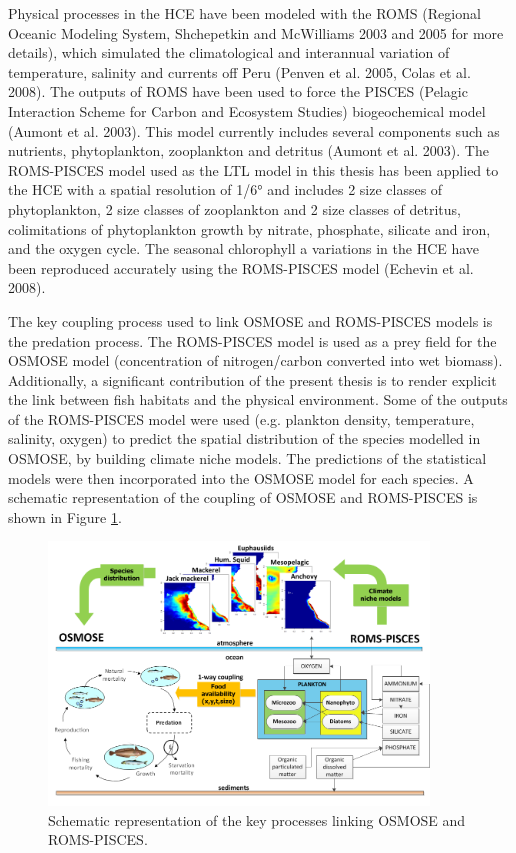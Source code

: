 Physical processes in the HCE have been modeled with the ROMS (Regional Oceanic Modeling System, Shchepetkin and McWilliams 2003 and 2005 for more details), which simulated the climatological and interannual variation of temperature, salinity and currents off Peru (Penven et al. 2005, Colas et al. 2008). The outputs of ROMS have been used to force the PISCES (Pelagic Interaction Scheme for Carbon and Ecosystem Studies) biogeochemical model (Aumont et al. 2003). This model currently includes several components such as nutrients, phytoplankton, zooplankton and detritus (Aumont et al. 2003). The ROMS-PISCES model used as the LTL model in this thesis has been applied to the HCE with a spatial resolution of 1/6° and includes 2 size classes of phytoplankton, 2 size classes of zooplankton and 2 size classes of detritus, colimitations of phytoplankton growth by nitrate, phosphate, silicate and iron, and the oxygen cycle. The seasonal chlorophyll a variations in the HCE have been reproduced accurately using the ROMS-PISCES model (Echevin et al. 2008). 

The key coupling process used to link OSMOSE and ROMS-PISCES models is the predation process. The ROMS-PISCES model is used as a prey field for the OSMOSE model (concentration of nitrogen/carbon converted into wet biomass). Additionally, a significant contribution of the present thesis is to render explicit the link between fish habitats and the physical environment. Some of the outputs of the ROMS-PISCES model were used (e.g. plankton density, temperature, salinity, oxygen) to predict the spatial distribution of the species modelled in OSMOSE, by building climate niche models. The predictions of the statistical models were then incorporated into the OSMOSE model for each species.
A schematic representation of the coupling of OSMOSE and ROMS-PISCES is shown in Figure \ref{figure-E2E}.

\begin{figure}[t]
\centering \includegraphics[width=0.9\textwidth]{figures/E2E_osmose}
\caption{Schematic representation of the key processes linking OSMOSE and ROMS-PISCES.}
\label{figure-E2E}
\end{figure}


